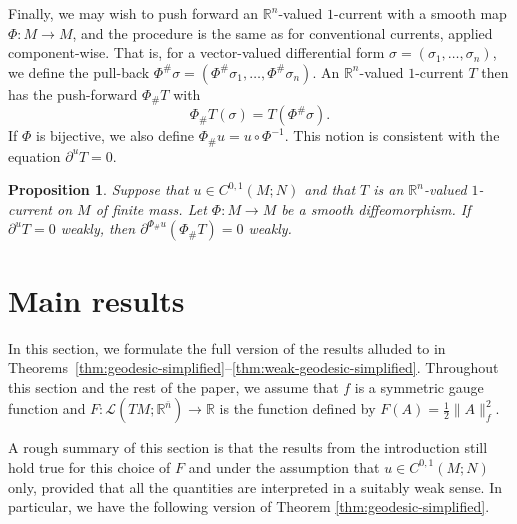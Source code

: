 \documentclass[a4paper]{article}
\newcommand{\R}{\mathbb{R}}
\newcommand{\ndim}{{\bar{n}}}
\newcommand{\Lin}{\mathcal{L}}
\newtheorem{proposition}[theorem]{Proposition}
\theoremstyle{definition}
\theoremstyle{remark}
\begin{document}
Finally, we may wish to push forward an $\R^n$-valued $1$-current with a smooth map $\Phi \colon M \to M$, and the procedure is the same as for conventional currents, applied component-wise. That is, for a vector-valued differential form $\sigma = (\sigma_1, \dotsc, \sigma_n)$, we define the pull-back $\Phi^\# \sigma = (\Phi^\# \sigma_1, \dotsc, \Phi^\# \sigma_n)$. An $\R^n$-valued $1$-current $T$ then has the push-forward $\Phi_\# T$ with
\[
\Phi_\# T(\sigma) = T(\Phi^\# \sigma).
\]
If $\Phi$ is bijective, we also define $\Phi_\# u = u \circ \Phi^{-1}$.
This notion is consistent with the equation $\partial^u T = 0$.

\begin{proposition} \label{prp:push-forward}
Suppose that $u \in C^{0, 1}(M; N)$ and that $T$ is an $\R^n$-valued $1$-current on $M$ of finite mass. Let $\Phi \colon M \to M$ be a smooth diffeomorphism. If $\partial^u T = 0$ weakly, then $\partial^{\Phi_\# u} (\Phi_\# T) = 0$ weakly.
\end{proposition}









\section{Main results} \label{sct:main-results}

In this section, we formulate the full version of the results alluded to in Theorems~\ref{thm:geodesic-simplified}--\ref{thm:weak-geodesic-simplified}. Throughout this section and the rest of the paper, we assume that
$f$ is a symmetric gauge function and $F \colon \Lin(TM; \R^\ndim) \to \R$ is the function defined by $F(A) = \frac{1}{2}\|A\|_f^2$.

A rough summary of this section is that the results from the introduction
still hold true for this choice of $F$ and under the assumption that
$u \in C^{0, 1}(M; N)$ only,
provided that all the quantities are interpreted in a suitably weak sense.
In particular, we have the following version of Theorem \ref{thm:geodesic-simplified}.
\end{document}

